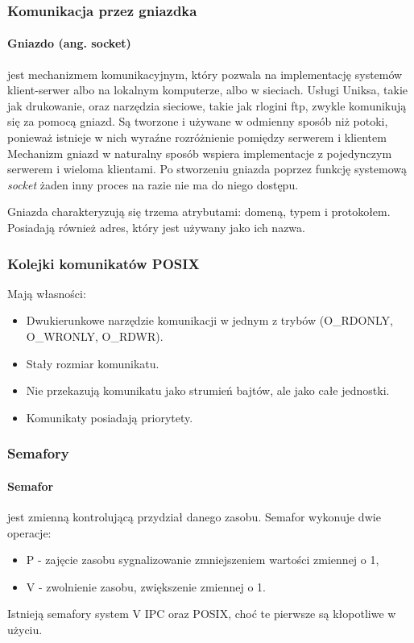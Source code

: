 \documentclass[a4paper,twoside]{report}
\begin{document}
\subsubsection{Komunikacja przez gniazdka}

\paragraph{Gniazdo (ang. socket)} jest mechanizmem komunikacyjnym, który pozwala na implementację systemów klient-serwer albo na lokalnym komputerze, albo w sieciach. Usługi Uniksa, takie jak drukowanie, oraz narzędzia sieciowe, takie jak rlogini ftp, zwykle komunikują się za pomocą gniazd.
Są tworzone i używane w odmienny sposób niż potoki, ponieważ istnieje w nich wyraźne rozróżnienie pomiędzy serwerem i klientem
Mechanizm gniazd w naturalny sposób wspiera implementacje z pojedynczym serwerem i wieloma klientami.
Po stworzeniu gniazda poprzez funkcję systemową \emph{socket} żaden inny proces na razie nie ma do niego dostępu.

Gniazda charakteryzują się trzema atrybutami: domeną, typem i protokołem. Posiadają również adres, który jest używany jako ich nazwa.

\subsubsection{Kolejki komunikatów POSIX}
Mają własności: 
\begin{itemize}
	\item Dwukierunkowe narzędzie komunikacji w jednym z trybów (O\_RDONLY, O\_WRONLY, O\_RDWR).
	\item Stały rozmiar komunikatu.
	\item Nie przekazują komunikatu jako strumień bajtów, ale jako całe jednostki.
	\item Komunikaty posiadają priorytety.
\end{itemize}

\subsubsection{Semafory}
\paragraph{Semafor} jest zmienną kontrolującą przydział danego zasobu. Semafor wykonuje dwie operacje:
\begin{itemize}
\item P - zajęcie zasobu sygnalizowanie zmniejszeniem wartości zmiennej o 1,
\item V - zwolnienie zasobu, zwiększenie zmiennej o 1.
\end{itemize}
Istnieją semafory system V IPC oraz POSIX, choć te pierwsze są kłopotliwe w użyciu.
\end{document}
